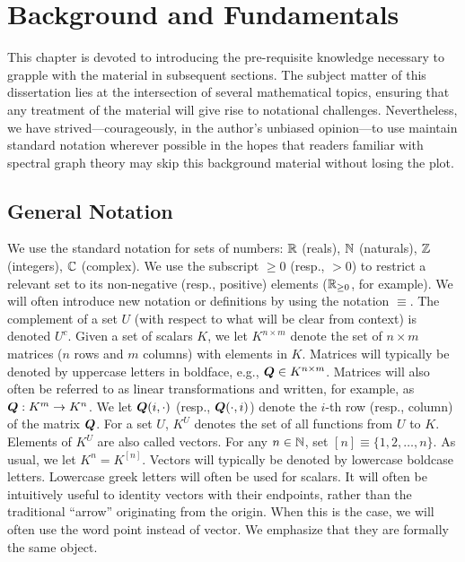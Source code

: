 \chapter{Background and Fundamentals}
\label{sec:background}
This chapter is devoted to introducing the  pre-requisite knowledge necessary to grapple with the material in subsequent sections. The subject matter of this dissertation lies at the intersection of several mathematical topics, ensuring that any treatment  of the material will give rise to notational challenges. Nevertheless, we have strived---courageously, in the author's unbiased opinion---to use maintain standard notation wherever possible in the hopes that readers familiar with spectral graph theory may skip this background material without losing the plot. 


\section{General Notation}
\label{sec:background_general}
We use the standard notation for sets of numbers: $\mathbb{R}$ (reals), $\mathbb{N}$ (naturals), $\mathbb{Z}$ (integers), $\mathbb{C}$ (complex).  We use the subscript $\geq 0$ (resp., $>0$) to restrict a relevant set to its non-negative (resp., positive) elements ($\mathbb{R}_{\geq 0}$, for example). 
We will often introduce new notation or definitions by using the notation $\equiv$. The complement of a set $U$ (with respect to what will be clear from context) is denoted $U^c$. 
Given a set of scalars $K$, we let $K^{n\times m}$ denote the set of $n\times m$ matrices ($n$ rows and $m$ columns) with elements in $K$. Matrices will typically be denoted by uppercase letters in boldface, e.g., $\vb*{Q}\in K^{n\times m}$. Matrices will also often be referred to as linear transformations and written, for example, as $\vb*{Q}:K^m \to K^n$. 
We let $\vb*{Q}(i,\cdot)$ (resp., $\vb*{Q}(\cdot,i)$) denote the $i$-th row (resp., column) of the matrix $\vb*{Q}$. 
For a set $U$, $K^U$ denotes the set of all functions from $U$ to $K$.  Elements of $K^U$ are also called vectors. For any $n\in\mathbb{N}$, set $[n]\equiv \{1,2,\dots,n\}$. As usual, we let $K^n=K^{[n]}$. Vectors will typically be denoted by lowercase boldcase letters. Lowercase  greek letters will often be used for scalars. It will often  be intuitively useful to identity vectors with their endpoints, rather than the traditional ``arrow'' originating from the origin. When this is the case, we will often use the word point instead of vector. We emphasize that they are formally the same object. 

